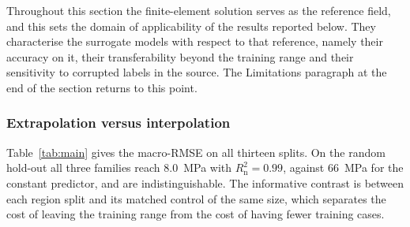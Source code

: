 \documentclass[subscriptcorrection,upint,varvw,barcolor=Goldenrod3,mathalfa=cal=euler,balance,hyphenate,french,pdf-a]{asmejour} %
\begin{document}
Throughout this section the finite-element solution serves as the reference field, and this sets the domain of applicability of the results reported below. They characterise the surrogate models with respect to that reference, namely their accuracy on it, their transferability beyond the training range and their sensitivity to corrupted labels in the source. The Limitations paragraph at the end of the section returns to this point. %

\subsubsection{Extrapolation versus interpolation}
\label{sec:res_extrap}


Table~\ref{tab:main} gives the macro-RMSE on all thirteen splits. On the random hold-out all three families reach 8.0~MPa with $R^2_{\mathrm{n}}=0.99$, against 66~MPa for the constant predictor, and are indistinguishable. The informative contrast is between each region split and its matched control of the same size, which separates the cost of leaving the training range from the cost of having fewer training cases.
\end{document}
